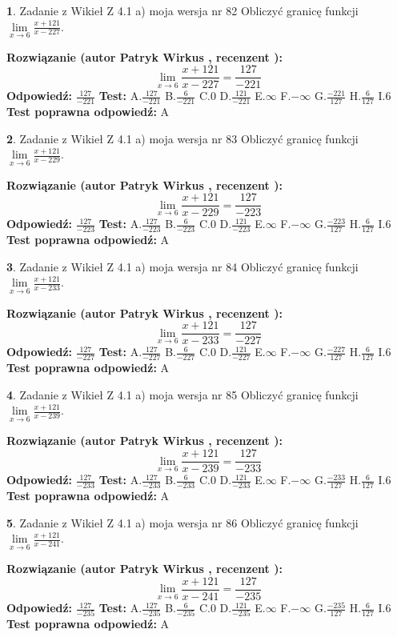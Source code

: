 \documentclass[12pt, a4paper]{article}
\theoremstyle{definition} %
\newtheorem{zad}{}
\newcommand{\zadStart}[1]{\begin{zad}#1\newline}
\newcommand{\zadStop}{\end{zad}}
\newcommand{\rozwStart}[2]{\noindent \textbf{Rozwiązanie (autor #1 , recenzent #2): }\newline}
\newcommand{\rozwStop}{\newline}
\newcommand{\odpStart}{\noindent \textbf{Odpowiedź:}\newline}
\newcommand{\odpStop}{\newline}
\newcommand{\testStart}{\noindent \textbf{Test:}\newline}
\newcommand{\testStop}{\newline}
\newcommand{\kluczStart}{\noindent \textbf{Test poprawna odpowiedź:}\newline}
\newcommand{\kluczStop}{\newline}
\begin{document}
\zadStart{Zadanie z Wikieł Z 4.1 a) moja wersja nr 82}
Obliczyć granicę funkcji $\lim\limits_{x\to6}\frac{x+121}{x-227}$.
\zadStop
\rozwStart{Patryk Wirkus}{}
$$\lim\limits_{x\to6}\frac{x+121}{x-227} = \frac{127}{-221}$$
\rozwStop
\odpStart
$\frac{127}{-221}$
\odpStop
\testStart
A.$\frac{127}{-221}$
B.$\frac{6}{-221}$
C.$0$
D.$\frac{121}{-221}$
E.$\infty$
F.$-\infty$
G.$\frac{-221}{127}$
H.$\frac{6}{127}$
I.$6$
\testStop
\kluczStart
A
\kluczStop



\zadStart{Zadanie z Wikieł Z 4.1 a) moja wersja nr 83}
Obliczyć granicę funkcji $\lim\limits_{x\to6}\frac{x+121}{x-229}$.
\zadStop
\rozwStart{Patryk Wirkus}{}
$$\lim\limits_{x\to6}\frac{x+121}{x-229} = \frac{127}{-223}$$
\rozwStop
\odpStart
$\frac{127}{-223}$
\odpStop
\testStart
A.$\frac{127}{-223}$
B.$\frac{6}{-223}$
C.$0$
D.$\frac{121}{-223}$
E.$\infty$
F.$-\infty$
G.$\frac{-223}{127}$
H.$\frac{6}{127}$
I.$6$
\testStop
\kluczStart
A
\kluczStop



\zadStart{Zadanie z Wikieł Z 4.1 a) moja wersja nr 84}
Obliczyć granicę funkcji $\lim\limits_{x\to6}\frac{x+121}{x-233}$.
\zadStop
\rozwStart{Patryk Wirkus}{}
$$\lim\limits_{x\to6}\frac{x+121}{x-233} = \frac{127}{-227}$$
\rozwStop
\odpStart
$\frac{127}{-227}$
\odpStop
\testStart
A.$\frac{127}{-227}$
B.$\frac{6}{-227}$
C.$0$
D.$\frac{121}{-227}$
E.$\infty$
F.$-\infty$
G.$\frac{-227}{127}$
H.$\frac{6}{127}$
I.$6$
\testStop
\kluczStart
A
\kluczStop



\zadStart{Zadanie z Wikieł Z 4.1 a) moja wersja nr 85}
Obliczyć granicę funkcji $\lim\limits_{x\to6}\frac{x+121}{x-239}$.
\zadStop
\rozwStart{Patryk Wirkus}{}
$$\lim\limits_{x\to6}\frac{x+121}{x-239} = \frac{127}{-233}$$
\rozwStop
\odpStart
$\frac{127}{-233}$
\odpStop
\testStart
A.$\frac{127}{-233}$
B.$\frac{6}{-233}$
C.$0$
D.$\frac{121}{-233}$
E.$\infty$
F.$-\infty$
G.$\frac{-233}{127}$
H.$\frac{6}{127}$
I.$6$
\testStop
\kluczStart
A
\kluczStop



\zadStart{Zadanie z Wikieł Z 4.1 a) moja wersja nr 86}
Obliczyć granicę funkcji $\lim\limits_{x\to6}\frac{x+121}{x-241}$.
\zadStop
\rozwStart{Patryk Wirkus}{}
$$\lim\limits_{x\to6}\frac{x+121}{x-241} = \frac{127}{-235}$$
\rozwStop
\odpStart
$\frac{127}{-235}$
\odpStop
\testStart
A.$\frac{127}{-235}$
B.$\frac{6}{-235}$
C.$0$
D.$\frac{121}{-235}$
E.$\infty$
F.$-\infty$
G.$\frac{-235}{127}$
H.$\frac{6}{127}$
I.$6$
\testStop
\kluczStart
A
\kluczStop
\end{document}

